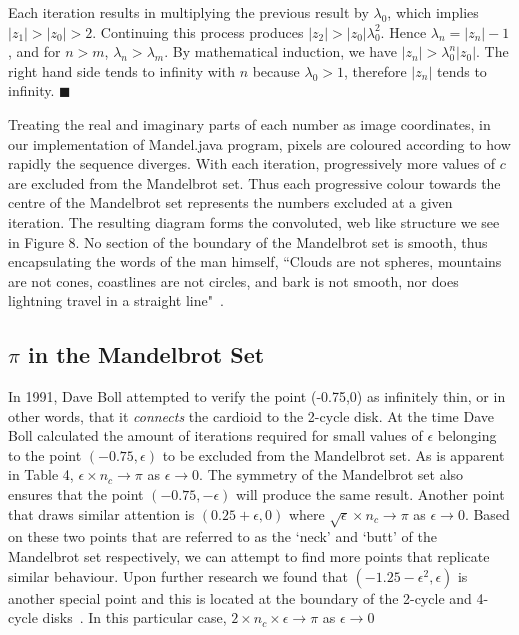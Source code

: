 \documentclass[a4paper]{article}
\begin{document}
Each iteration results in multiplying the previous result by $\lambda_{0}$, which implies $|z_{1}|>|z_{0}|>2$. Continuing this process produces $|z_{2}|>|z_{0}|\lambda_{0}^2$. Hence $\lambda_{n}=|z_{n}|-1$, and for $n>m$, $\lambda_{n}>\lambda_{m}$. 
By mathematical induction, we have $|z_{n}|>\lambda_{0}^{n}|z_{0}|$. The right hand side tends to infinity with $n$ because $\lambda_{0}>1$, therefore $|z_{n}|$ tends to infinity. $\blacksquare$ \cite{Klebanoff}

Treating the real and imaginary parts of each number as image coordinates, in our implementation of Mandel.java program, pixels are coloured according to how rapidly the sequence diverges. With each iteration, progressively more values of $c$ are excluded from the Mandelbrot set. Thus each progressive colour towards the centre of the Mandelbrot set represents the numbers excluded at a given iteration. The resulting diagram forms the convoluted, web like structure we see in Figure 8. No section of the boundary of the Mandelbrot set is smooth, thus encapsulating the words of the man himself, ``Clouds are not spheres, mountains are not cones, coastlines are not circles, and bark is not smooth, nor does lightning travel in a straight line"~\cite{FractalsGeometry}.

\pagebreak

\subsection{$\pi$ in the Mandelbrot Set}

In 1991, Dave Boll attempted to verify the point (-0.75,0) as infinitely thin, or in other words, that it \emph{connects} the cardioid to the 2-cycle disk. At the time Dave Boll calculated the amount of iterations required for small values of $\epsilon$ belonging to the point $(-0.75,\epsilon)$ to be excluded from the Mandelbrot set. As is apparent in Table 4, $\epsilon \times n_{c} \rightarrow \pi$ as $\epsilon \rightarrow 0$. The symmetry of the Mandelbrot set also ensures that the point $(-0.75, -\epsilon)$ will produce the same result. Another point that draws similar attention is $(0.25+\epsilon, 0)$ where $\sqrt{\epsilon} \times n_{c} \rightarrow \pi$ as $\epsilon \rightarrow 0$. Based on these two points that are referred to as the `neck' and `butt' of the Mandelbrot set respectively, we can attempt to find more points that replicate similar behaviour. Upon further research we found that $(-1.25 - \epsilon ^ 2, \epsilon)$ is another special point and this is located at the boundary of the 2-cycle and 4-cycle disks~\cite{piInMandel}. In this particular case, $2 \times n_{c} \times \epsilon \rightarrow \pi$ as $\epsilon \rightarrow 0$
\end{document}
